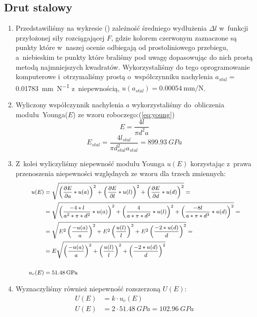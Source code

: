 \documentclass{fizraport}
\begin{document}
\subsection{Drut stalowy}
\begin{enumerate}
    \item Przedstawiliśmy na wykresie () zależność średniego wydłużenia $\Delta l$ w~funkcji przyłożonej siły rozciągającej $F$, gdzie kolorem czerwonym zaznaczone są punkty które w~naszej ocenie odbiegają od prostoliniowego
przebiegu, a~niebieskim te punkty które braliśmy pod uwagę dopasowując do nich prostą metodą najmniejszych kwadratów. Wykorzystaliśmy do tego oprogramowanie komputerowe i~otrzymaliśmy prostą o~współczynniku nachylenia $a_{stal}=$\SI{0.01783}{\milli\metre\per\newton} z~niepewnością, $u(a_{stal})=\SI{0.00054}{\milli\metre\per\newton}$.

\item 
Wyliczony współczynnik nachylenia $a$ wykorzystaliśmy do~obliczenia modułu~Younga($E$) ze wzoru roboczego:(\ref{eq:young})
\begin{equation}
\label{eq:young}
    E = \frac{4l}{\pi d^2 a}
\end{equation}
\begin{equation*}
    E_{stal} = \frac{4l_{stal}}{\pi d_{stal}^2 a_{stal}}= \SI{899.93}{GPa} 
\end{equation*} %

\item Z~kolei wyliczyliśmy niepewność modułu Younga $u(E)$ korzystając z~prawa przenoszenia
niepewności względnych ze wzoru dla trzech zmiennych:
\begin{equation*}
\footnotesize
\begin{split}
    u(E)&=\sqrt{\left (\frac{\partial E}{\partial a}*u(a)\right )^2+\left (\frac{\partial E}{\partial l}*u(l)\right )^2+\left (\frac{\partial E}{\partial d}*u(d)\right )^2}=\\
&=\sqrt{\left(\frac{-4*l}{a^2*\pi *d^2}*u(a)\right)^2+\left(\frac{4}{a*\pi *d^2}*u(l)\right)^2+\left(\frac{-8l}{a*\pi *d^3}*u(d)\right)^2}=\\
&= \sqrt{E^2\left (\frac{-u(a)}{a} \right )^2 + E^2\left (\frac{u(l)}{l} \right )^2 + E^2\left (\frac{-2*u(d)}{d} \right )^2}=\\
&= E\sqrt{\left (\frac{-u(a)}{a} \right )^2 + \left (\frac{u(l)}{l} \right )^2 + \left (\frac{-2*u(d)}{d} \right )^2} \\
\\
u_c(E) &= \SI{51.48} {GPa} 
\end{split}
\end{equation*}

\item Wyznaczyliśmy również niepewność rozszerzoną $U(E)$:
\begin{align*}
        U(E) &= k \cdot u_c(E) \\
        U(E) &= 2 \cdot  \SI{51.48}{GPa}  =  \SI{102.96}{GPa} 
\end{align*}
\end{enumerate}
\end{document}
